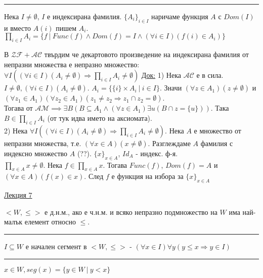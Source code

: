 \documentclass[fleqn, titlepage, 12pt]{report}
\begin{document}
\bigbreak
\hrule
\bigbreak

 Нека $ I \neq \emptyset $, $ I $ е индексирана фамилия.
$ \{ A_i \}_{i \in I} $ наричаме функция $ A $ с $ Dom(I) $ и вместо $ A(i) $ пишем $ A_i $.
\bigbreak
$ \prod_{i \in I} A_i = \{f\ |\ Func(f) \land Dom(f) = I \land (\forall{i \in I})(f(i) \in A_i)\}  $
\bigbreak

 В $ \mathcal{ZF} + \mathcal{AC} $ твърдим че декартовото произведение на индексирана фамилия от непразни
множества е непразно множество:
$ \forall{I}((\forall{i \in I})(A_i \neq \emptyset) \Rightarrow \prod_{i \in I} A_i \neq \emptyset  ) $
\bigbreak
\underline{Док:} 1) Нека $ \mathcal{AC} $ е в сила. $ I \neq \emptyset, (\forall{i \in I})(A_i \neq \emptyset) $.
$ A_i = \{\{ i \} \times  A_i\ |\ i \in I\} $. Значи $ (\forall{z \in A_1})(z \neq \emptyset) $ и
$ (\forall{z_1 \in A_1})(\forall{z_2 \in A_1})(z_1 \neq z_2 \Rightarrow z_1 \cap z_2 = \emptyset) $.\\
Тогава от $ \mathcal{AM} \implies \exists{B}(B \subseteq A_1 \land (\forall{z \in A_1})\exists{u}(B \cap z = \{ u \}))$.
Така $ B \in \prod_{i \in I} A_i $ (от тук идва името на аксиомата).\\
2) Нека $  \forall{I}((\forall{i \in I})(A_i \neq \emptyset) \Rightarrow \prod_{i \in I} A_i \neq \emptyset  )  $.
Нека $ A $ е множество от непразни множества, т.е. $ (\forall{x \in A})(x \neq \emptyset) $.
Разглеждаме $ A $ фамилия с индексно множество $ A $ (??). $ \{ x \}_{x \in A} $, $ Id_A $ - индекс. ф-я.\\
$ \prod_{x \in A} x \neq \emptyset   $. Нека $ f \in \prod_{x \in A} x $. Тогава $ Func(f) $, $ Dom(f) = A $ и
$ (\forall{x \in A})(f(x) \in x) $. След $ f $ е функция на избора за $ \{ x \}_{x \in A} $


\clearpage
\begin{center}
  \underline{\huge\normalfont Лекция 7}
\end{center}
\bigbreak

\bigbreak

$ <W,\leq> $ е д.н.м., ако е ч.н.м. и всяко непразно подмножество на $ W $ има най-малък елемент относно $ \leq $.
\bigbreak
\hrule
\bigbreak

$ I \subseteq W $ е начален сегмент в $ <W, \leq> $ - $ (\forall{x \in I})\forall{y}(y \leq x \Rightarrow y \in I) $

\bigbreak
\hrule
\bigbreak

$ x \in W, seg(x) = \{y \in W\ |\ y < x\} $
\end{document}
